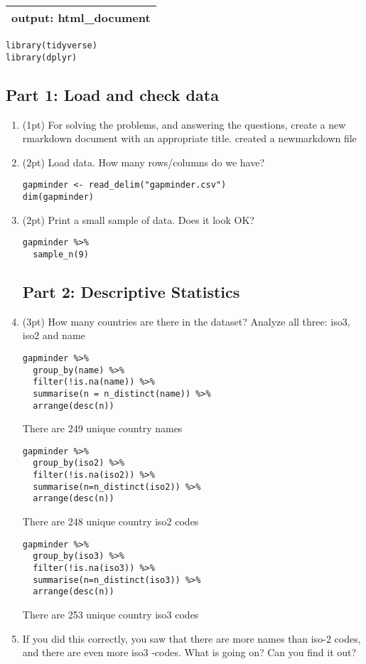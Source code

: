 \documentclass[]{article}
\author{}
\date{\vspace{-2.5em}}
\begin{document}
\begin{longtable}[]{@{}l@{}}
\toprule
output: html\_document\tabularnewline
\bottomrule
\end{longtable}

\begin{verbatim}
library(tidyverse)
library(dplyr)
\end{verbatim}

\subsection{Part 1: Load and check
data}\label{part-1-load-and-check-data}

\begin{enumerate}
\def\labelenumi{\arabic{enumi}.}
\item
  (1pt) For solving the problems, and answering the questions, create a
  new rmarkdown document with an appropriate title. created a
  newmarkdown file
\item
  (2pt) Load data. How many rows/columns do we have?

\begin{verbatim}
gapminder <- read_delim("gapminder.csv")
dim(gapminder)
\end{verbatim}
\item
  (2pt) Print a small sample of data. Does it look OK?

\begin{verbatim}
gapminder %>% 
  sample_n(9)
\end{verbatim}

  \subsection{Part 2: Descriptive
  Statistics}\label{part-2-descriptive-statistics}
\item
  (3pt) How many countries are there in the dataset? Analyze all three:
  iso3, iso2 and name

\begin{verbatim}
gapminder %>% 
  group_by(name) %>%   
  filter(!is.na(name)) %>% 
  summarise(n = n_distinct(name)) %>% 
  arrange(desc(n))
\end{verbatim}

  There are 249 unique country names

\begin{verbatim}
gapminder %>% 
  group_by(iso2) %>%   
  filter(!is.na(iso2)) %>% 
  summarise(n=n_distinct(iso2)) %>% 
  arrange(desc(n))
\end{verbatim}

  There are 248 unique country iso2 codes

\begin{verbatim}
gapminder %>% 
  group_by(iso3) %>%   
  filter(!is.na(iso3)) %>% 
  summarise(n=n_distinct(iso3)) %>% 
  arrange(desc(n))
\end{verbatim}

  There are 253 unique country iso3 codes
\item
  If you did this correctly, you saw that there are more names than
  iso-2 codes, and there are even more iso3 -codes. What is going on?
  Can you find it out?
\end{enumerate}
\end{document}
